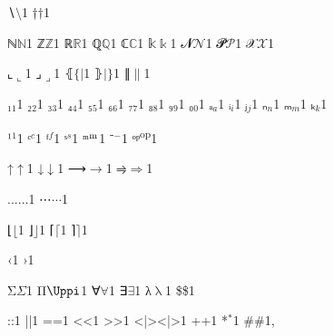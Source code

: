 {{∖}{{\color{symbolcolor}\ensuremath{\setminus}}}1
{†}{{\color{symbolcolor}\ensuremath{\dag}}}1

{ℕ}{{\ensuremath{\mathbb{N}}}}1
{ℤ}{{\ensuremath{\mathbb{Z}}}}1
{ℝ}{{\ensuremath{\mathbb{R}}}}1
{ℚ}{{\ensuremath{\mathbb{Q}}}}1
{ℂ}{{\ensuremath{\mathbb{C}}}}1
{𝕜}{{\ensuremath{\Bbbk}}}1
{𝓝}{{\ensuremath{\mathcal{N}}}}1
{𝓟}{{\ensuremath{\mathcal{P}}}}1
{𝒳}{{\ensuremath{\mathcal{X}}}}1

{⌞}{{\ensuremath{\llcorner}}}1
{⌟}{{\ensuremath{\lrcorner}}}1
{⦃}{{\ensuremath{\{\!|}}}1
{⦄}{{\ensuremath{|\!\}}}}1
{∥}{{\ensuremath{\|}}}1

{₁}{{\ensuremath{_1}}}1
{₂}{{\ensuremath{_2}}}1
{₃}{{\ensuremath{_3}}}1
{₄}{{\ensuremath{_4}}}1
{₅}{{\ensuremath{_5}}}1
{₆}{{\ensuremath{_6}}}1
{₇}{{\ensuremath{_7}}}1
{₈}{{\ensuremath{_8}}}1
{₉}{{\ensuremath{_9}}}1
{₀}{{\ensuremath{_0}}}1
{ₐ}{{\ensuremath{_a}}}1
{ᵢ}{{\ensuremath{_i}}}1
{ⱼ}{{\ensuremath{_j}}}1
{ₙ}{{\ensuremath{_n}}}1
{ₘ}{{\ensuremath{_m}}}1
{ₖ}{{\ensuremath{_k}}}1

{¹}{{\ensuremath{^1}}}1
{ᶜ}{{\color{symbolcolor}\ensuremath{^c}}}1
{ᶠ}{\color{symbolcolor}\ensuremath{^f}}1
{ˢ}{{\color{symbolcolor}\ensuremath{^s}}}1
{ᵐ}{{\color{symbolcolor}\ensuremath{\textsuperscript{m}}}}1
{⁻}{{\ensuremath{^{-}}}}1
{ᵒᵖ}{{\color{symbolcolor}\textsuperscript{op}}}1

{↑}{{\color{symbolcolor}\ensuremath{\uparrow}}}1
{↓}{{\color{symbolcolor}\ensuremath{\downarrow}}}1
{⟶}{{\color{symbolcolor}\ensuremath{\longrightarrow}}}1
{⥤}{{\color{symbolcolor}\ensuremath{\Rightarrow}}}1

{...}{{\ensuremath{\ldots}}}1
{⋯}{{\color{symbolcolor}\ensuremath{\cdots}}}1

{⌊}{{\ensuremath{\lfloor}}}1
{⌋}{{\ensuremath{\rfloor}}}1
{⌈}{{\ensuremath{\lceil}}}1
{⌉}{{\ensuremath{\rceil}}}1

{‹}{{\guilsinglleft}}1
{›}{{\guilsinglright}}1

{Σ}{{\color{symbolcolor}\ensuremath{\Sigma}}}1
{Π}{{\color{symbolcolor}\ensuremath{\Uppi}}}1 %
{∀}{{\color{symbolcolor}\ensuremath{\forall}}}1
{∃}{{\color{symbolcolor}\ensuremath{\exists}}}1
{λ}{{\color{symbolcolor}\ensuremath{\uplambda}}}1
{\$}{{\color{symbolcolor}\$}}1

{:}{{\color{symbolcolor}:}}1
{|}{{\color{symbolcolor}|}}1
{=}{{\color{symbolcolor}=}}1
{<}{{\color{symbolcolor}<}}1
{>}{{\color{symbolcolor}>}}1
{<|>}{{\color{symbolcolor}<|>}}1
{+}{{\color{symbolcolor}+}}1
{*}{{\color{symbolcolor}\ensuremath{{}^{*}}}}1
{\#}{{\color{keywordcolor}\#}}1, %

}
